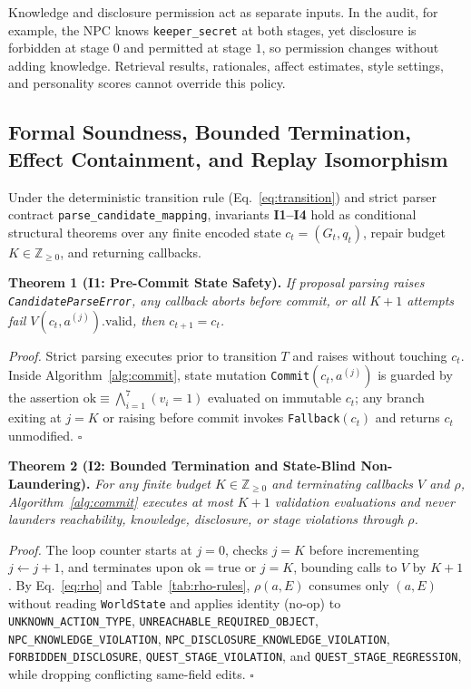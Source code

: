 \documentclass[journal]{IEEEtran}
\begin{document}
Knowledge and disclosure permission act as separate inputs. In the audit, for example, the NPC knows \texttt{keeper\_secret} at both stages, yet disclosure is forbidden at stage $0$ and permitted at stage $1$, so permission changes without adding knowledge. Retrieval results, rationales, affect estimates, style settings, and personality scores cannot override this policy.

\subsection{Formal Soundness, Bounded Termination, Effect Containment, and Replay Isomorphism}\label{sec:formal-proofs}
Under the deterministic transition rule (Eq.~\ref{eq:transition}) and strict parser contract \texttt{parse\_\allowbreak candidate\_\allowbreak mapping}, invariants \textbf{I1--I4} hold as conditional structural theorems over any finite encoded state $c_t=(G_t,q_t)$, repair budget $K\in\mathbb{Z}_{\geq 0}$, and returning callbacks.

\noindent\textbf{Theorem 1 (I1: Pre-Commit State Safety).} \emph{If proposal parsing raises \texttt{CandidateParseError}, any callback aborts before commit, or all $K{+}1$ attempts fail $V(c_t,a^{(j)}).\mathrm{valid}$, then $c_{t+1}=c_t$.}
\par\noindent\textit{Proof.} Strict parsing executes prior to transition $T$ and raises without touching $c_t$. Inside Algorithm~\ref{alg:commit}, state mutation \texttt{Commit}$(c_t,a^{(j)})$ is guarded by the assertion $\mathrm{ok}\equiv\bigwedge_{i=1}^{7}(v_i=1)$ evaluated on immutable $c_t$; any branch exiting at $j=K$ or raising before commit invokes \texttt{Fallback}$(c_t)$ and returns $c_t$ unmodified. \hfill$\square$

\noindent\textbf{Theorem 2 (I2: Bounded Termination and State-Blind Non-Laundering).} \emph{For any finite budget $K\in\mathbb{Z}_{\geq 0}$ and terminating callbacks $V$ and $\rho$, Algorithm~\ref{alg:commit} executes at most $K{+}1$ validation evaluations and never launders reachability, knowledge, disclosure, or stage violations through $\rho$.}
\par\noindent\textit{Proof.} The loop counter starts at $j=0$, checks $j=K$ before incrementing $j\leftarrow j{+}1$, and terminates upon $\mathrm{ok}=\mathrm{true}$ or $j=K$, bounding calls to $V$ by $K{+}1$. By Eq.~\ref{eq:rho} and Table~\ref{tab:rho-rules}, $\rho(a,E)$ consumes only $(a,E)$ without reading \texttt{WorldState} and applies identity (no-op) to \texttt{UNKNOWN\_\allowbreak ACTION\_\allowbreak TYPE}, \texttt{UNREACHABLE\_\allowbreak REQUIRED\_\allowbreak OBJECT}, \texttt{NPC\_}\allowbreak\texttt{KNOWLEDGE\_}\allowbreak\texttt{VIOLATION}, \texttt{NPC\_\allowbreak DISCLOSURE\_\allowbreak KNOWLEDGE\_\allowbreak VIOLATION}, \texttt{FORBIDDEN\_\allowbreak DISCLOSURE}, \texttt{QUEST\_\allowbreak STAGE\_\allowbreak VIOLATION}, and \texttt{QUEST\_\allowbreak STAGE\_\allowbreak REGRESSION}, while dropping conflicting same-field edits. \hfill$\square$
\end{document}
